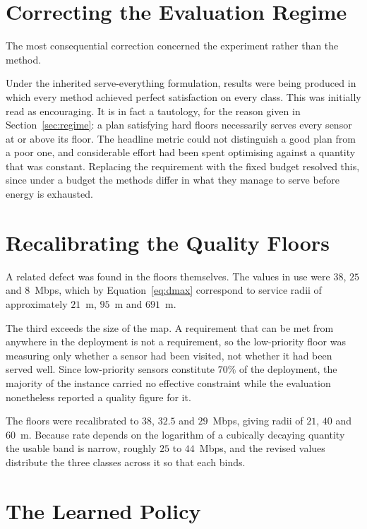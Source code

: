 \section{Correcting the Evaluation Regime}

The most consequential correction concerned the experiment rather than the method.

Under the inherited serve-everything formulation, results were being produced in which every method achieved perfect satisfaction on every class. This was initially read as encouraging. It is in fact a tautology, for the reason given in Section~\ref{sec:regime}: a plan satisfying hard floors necessarily serves every sensor at or above its floor. The headline metric could not distinguish a good plan from a poor one, and considerable effort had been spent optimising against a quantity that was constant. Replacing the requirement with the fixed budget resolved this, since under a budget the methods differ in what they manage to serve before energy is exhausted.

\section{Recalibrating the Quality Floors}

A related defect was found in the floors themselves. The values in use were $38$, $25$ and $8$~Mbps, which by Equation~\eqref{eq:dmax} correspond to service radii of approximately $21$~m, $95$~m and $691$~m.

The third exceeds the size of the map. A requirement that can be met from anywhere in the deployment is not a requirement, so the low-priority floor was measuring only whether a sensor had been visited, not whether it had been served well. Since low-priority sensors constitute $70\%$ of the deployment, the majority of the instance carried no effective constraint while the evaluation nonetheless reported a quality figure for it.

The floors were recalibrated to $38$, $32.5$ and $29$~Mbps, giving radii of $21$, $40$ and $60$~m. Because rate depends on the logarithm of a cubically decaying quantity the usable band is narrow, roughly $25$ to $44$~Mbps, and the revised values distribute the three classes across it so that each binds.

\section{The Learned Policy}
\label{sec:tasks_rl}


